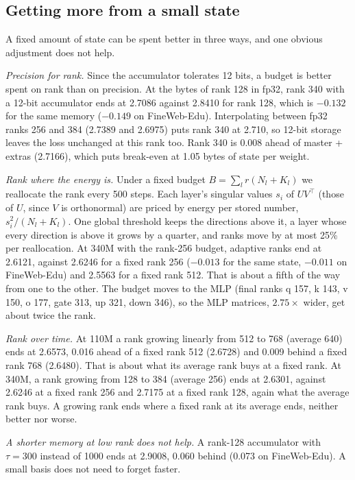 \documentclass[10pt,twocolumn]{article}
\begin{document}
\subsection{Getting more from a small state}\label{sec:adaptive}
A fixed amount of state can be spent better in three ways, and one obvious adjustment does not help.

\emph{Precision for rank.} Since the accumulator tolerates 12 bits, a budget is better spent on rank than on precision.
At the bytes of rank 128 in fp32, rank 340 with a 12-bit accumulator ends at 2.7086 against 2.8410 for rank 128, which
is $-0.132$ for the same memory ($-0.149$ on FineWeb-Edu). Interpolating between fp32 ranks 256 and 384 (2.7389 and
2.6975) puts rank 340 at 2.710, so 12-bit storage leaves the loss unchanged at this rank too. Rank 340 is 0.008 ahead of master + extras
(2.7166), which puts break-even at 1.05 bytes of state per weight.

\emph{Rank where the energy is.} Under a fixed budget $B=\sum_l r(N_l+K_l)$ we reallocate the rank every 500 steps. Each
layer's singular values $s_i$ of $UV^\top$ (those of $U$, since $V$ is orthonormal) are priced by energy per stored
number, $s_i^2/(N_l+K_l)$. One global threshold keeps the directions above it, a layer whose every direction is above it
grows by a quarter, and ranks move by at most 25\% per reallocation. At 340M with the rank-256 budget, adaptive ranks
end at 2.6121, against 2.6246 for a fixed rank 256 ($-0.013$ for the same state, $-0.011$ on FineWeb-Edu) and 2.5563 for
a fixed rank 512. That is about a fifth of the way from one to the other. The budget moves to the MLP (final ranks q
157, k 143, v 150, o 177, gate 313, up 321, down 346), so the MLP matrices, $2.75\times$ wider, get about twice the rank.

\emph{Rank over time.} At 110M a rank growing linearly from 512 to 768 (average 640) ends at 2.6573, 0.016 ahead of a
fixed rank 512 (2.6728) and 0.009 behind a fixed rank 768 (2.6480). That is about what its average rank buys at a fixed
rank. At 340M, a rank growing from 128 to 384 (average 256) ends at 2.6301, against 2.6246 at a fixed rank 256 and 2.7175
at a fixed rank 128, again what the average rank buys. A growing rank ends where a fixed rank at its average ends, neither
better nor worse.

\emph{A shorter memory at low rank does not help.} A rank-128 accumulator with $\tau=300$ instead of 1000 ends at 2.9008,
0.060 behind (0.073 on FineWeb-Edu). A small basis does not need to forget faster.
\end{document}
